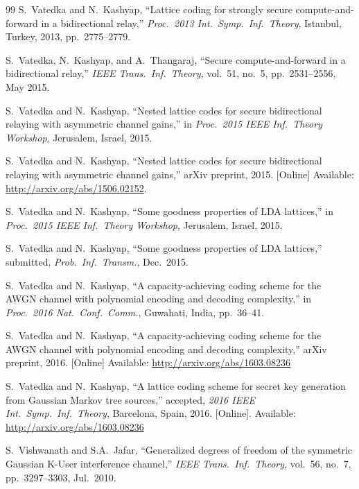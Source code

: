 \documentclass[main.tex]{subfiles}
\begin{document}
\begin{thebibliography}{99}
S.\ Vatedka and N.\ Kashyap, ``Lattice coding for strongly secure compute-and-forward in a bidirectional relay,'' \emph{Proc.\ 2013 Int.\ Symp.\ Inf.\ Theory}, Istanbul, Turkey, 2013, pp.\ 2775--2779.

S.\ Vatedka, N.\ Kashyap, and A.\ Thangaraj, ``Secure compute-and-forward in a bidirectional relay,'' \emph{IEEE Trans.\ Inf.\ Theory,} vol.\ 51, no.\ 5, pp.\ 2531--2556, May 2015.

S.\ Vatedka and N.\ Kashyap, ``Nested lattice codes for secure bidirectional relaying with asymmetric channel gains,'' in \emph{Proc.\ 2015 IEEE Inf.\ Theory Workshop},  Jerusalem, Israel, 2015.

S.\ Vatedka and N.\ Kashyap, ``Nested lattice codes for secure bidirectional relaying with asymmetric channel gains,'' arXiv preprint, 2015. [Online] Available: \url{http://arxiv.org/abs/1506.02152}.

S.\ Vatedka and N.\ Kashyap, ``Some goodness properties of LDA lattices,'' in \emph{Proc.\ 2015 IEEE Inf.\ Theory Workshop},  Jerusalem, Israel, 2015.

S.\ Vatedka and N.\ Kashyap, ``Some goodness properties of LDA lattices,'' submitted, \emph{Prob.\ Inf.\ Transm.},  Dec.\ 2015.

S.\ Vatedka and N.\ Kashyap, ``A capacity-achieving coding scheme for the AWGN channel with polynomial encoding and decoding complexity,'' in \emph{Proc.\ 2016 Nat.\ Conf.\ Comm.}, Guwahati, India, pp.\ 36--41.

S.\ Vatedka and N.\ Kashyap, ``A capacity-achieving coding scheme for the AWGN channel with polynomial encoding and decoding complexity,'' arXiv preprint, 2016. [Online] Available:
\url{http://arxiv.org/abs/1603.08236}

S.\ Vatedka and N.\ Kashyap, ``A lattice coding scheme for secret key generation from Gaussian Markov tree sources,'' accepted, \emph{2016 IEEE Int.\ Symp.\ Inf.\ Theory}, Barcelona, Spain, 2016. [Online]. Available:
\url{http://arxiv.org/abs/1603.08236}

S.\ Vishwanath and S.A.\ Jafar, ``Generalized degrees of freedom of the symmetric Gaussian K-User interference channel,'' 
\emph{IEEE Trans.\ Inf.\ Theory}, vol.\ 56, no.\ 7, pp.\ 3297--3303, Jul.\ 2010.


\end{thebibliography}
\end{document}
